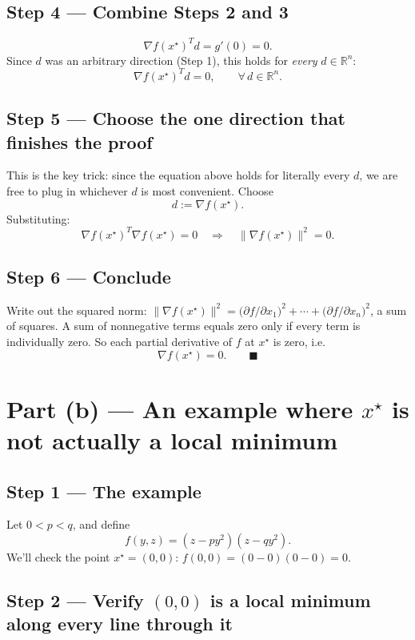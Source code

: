 \documentclass[11pt]{article}
\newcommand{\R}{\mathbb{R}}
\begin{document}
\subsection*{Step 4 --- Combine Steps 2 and 3}

\[
\nabla f(x^\star)^T d = g'(0) = 0.
\]
Since $d$ was an arbitrary direction (Step 1), this holds for \emph{every} $d\in\R^n$:
\[
\nabla f(x^\star)^T d = 0, \qquad \forall\, d \in \R^n.
\]

\subsection*{Step 5 --- Choose the one direction that finishes the proof}

This is the key trick: since the equation above holds for literally every $d$, we are free to plug in whichever $d$ is most convenient. Choose
\[
d := \nabla f(x^\star).
\]
Substituting:
\[
\nabla f(x^\star)^T \nabla f(x^\star) = 0 \quad\Longrightarrow\quad \|\nabla f(x^\star)\|^2 = 0.
\]

\subsection*{Step 6 --- Conclude}

Write out the squared norm: $\|\nabla f(x^\star)\|^2 = \big(\partial f/\partial x_1\big)^2 + \cdots + \big(\partial f/\partial x_n\big)^2$, a sum of squares. A sum of nonnegative terms equals zero only if every term is individually zero. So each partial derivative of $f$ at $x^\star$ is zero, i.e.
\[
\nabla f(x^\star) = 0. \qquad \blacksquare
\]

\section*{Part (b) --- An example where $x^\star$ is not actually a local minimum}

\subsection*{Step 1 --- The example}

Let $0<p<q$, and define
\[
f(y,z) = (z-py^2)(z-qy^2).
\]
We'll check the point $x^\star=(0,0)$: $f(0,0) = (0-0)(0-0)=0$.

\subsection*{Step 2 --- Verify $(0,0)$ is a local minimum along every line through it}
\end{document}
